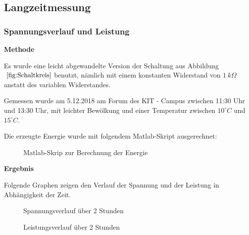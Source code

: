 \subsection {Langzeitmessung}                                       %
    \subsubsection{Spannungsverlauf und Leistung}                       %
        \textbf{Methode}
        \newline
        \par Es wurde eine leicht abgewandelte Version der Schaltung aus Abbildung $~\ref{fig:Schaltkreis}$ benutzt, nämlich mit einem konstanten Widerstand von $1\ k\Omega$ anstatt des variablen Widerstandes.
        \par Gemessen wurde am 5.12.2018 am Forum des KIT - Campus zwischen 11:30 Uhr und 13:30 Uhr, mit leichter Bewölkung und einer Temperatur zwischen $10^{\circ}C$ und $15^{\circ}C$.
        \par Die erzeugte Energie wurde mit folgendem Matlab-Skript ausgerechnet:
        
        \begin{figure}[H]
            
            \caption{Matlab-Skrip zur Berechnung der Energie}
        \end{figure}
        
        \vspace{4mm}
        \noindent
        \textbf{Ergebnis}
        \newline
        \par Folgende Graphen zeigen den Verlauf der Spannung und der Leistung in Abhängigkeit der Zeit.
        
        \begin{figure}[H]
            \def\svgwidth{\textwidth}
            
            
            \caption{Spannungsverlauf über 2 Stunden}
        \end{figure}

        \begin{figure}[H]
            \def\svgwidth{\textwidth}
            
            
            \caption{Leistungsverlauf über 2 Stunden}
        \end{figure}
        
